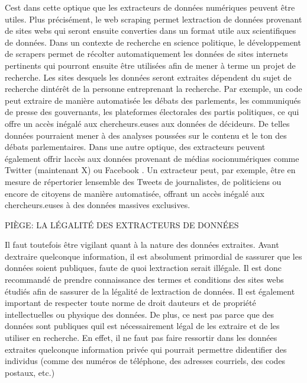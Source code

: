 \documentclass[
  letterpaper,
  DIV=11,
  numbers=noendperiod]{scrreprt}
\begin{document}
C\textquotesingle est dans cette optique que les extracteurs de données
numériques peuvent être utiles. Plus précisément, le web scraping permet
l\textquotesingle extraction de données provenant de sites webs qui
seront ensuite converties dans un format utile aux scientifiques de
données. Dans un contexte de recherche en science politique, le
développement de scrapers permet de récolter automatiquement les données
de sites internets pertinents qui pourront ensuite être utilisées afin
de mener à terme un projet de recherche. Les sites desquels les données
seront extraites dépendent du sujet de recherche
d\textquotesingle intérêt de la personne entreprenant la recherche. Par
exemple, un code peut extraire de manière automatisée les débats des
parlements, les communiqués de presse des gouvernants, les plateformes
électorales des partis politiques, ce qui offre un accès inégalé aux
chercheurs.euses aux données de décideurs. De telles données pourraient
mener à des analyses poussées sur le contenu et le ton des débats
parlementaires. Dans une autre optique, des extracteurs peuvent
également offrir l\textquotesingle accès aux données provenant de médias
socionumériques comme Twitter (maintenant X) ou Facebook . Un extracteur
peut, par exemple, être en mesure de répertorier
l\textquotesingle ensemble des Tweets de journalistes, de politiciens ou
encore de citoyens de manière automatisée, offrant un accès inégalé aux
chercheurs.euses à des données massives exclusives.

PIÈGE: LA LÉGALITÉ DES EXTRACTEURS DE DONNÉES

Il faut toutefois être vigilant quant à la nature des données extraites.
Avant d\textquotesingle extraire quelconque information, il est
absolument primordial de s\textquotesingle assurer que les données
soient publiques, faute de quoi l\textquotesingle extraction serait
illégale. Il est donc recommandé de prendre connaissance des termes et
conditions des sites webs étudiés afin de s\textquotesingle assurer de
la légalité de l\textquotesingle extraction de données. Il est également
important de respecter toute norme de droit d\textquotesingle auteurs et
de propriété intellectuelles ou physique des données. De plus, ce
n\textquotesingle est pas parce que des données sont publiques
qu\textquotesingle il est nécessairement légal de les extraire et de les
utiliser en recherche. En effet, il ne faut pas faire ressortir dans les
données extraites quelconque information privée qui pourrait permettre
d\textquotesingle identifier des individus (comme des numéros de
téléphone, des adresses courriels, des codes postaux, etc.)~
\end{document}
